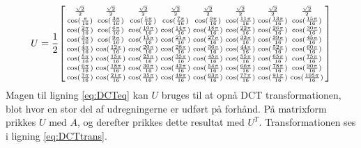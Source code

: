 \begin{equation}
U=\frac{1}{2}
\begin{bsmallmatrix}
	\frac{\sqrt{2}}{2}	& \frac{\sqrt{2}}{2}		& \frac{\sqrt{2}}{2}		& \frac{\sqrt{2}}{2}		& \frac{\sqrt{2}}{2}		& \frac{\sqrt{2}}{2}		& \frac{\sqrt{2}}{2}		& \frac{\sqrt{2}}{2}		\\
	\cos(\frac{\pi}{16})		& \cos(\frac{3\pi}{16})	& \cos(\frac{5\pi}{16})	& \cos(\frac{7\pi}{16})	& \cos(\frac{9\pi}{16})	& \cos(\frac{11\pi}{16})	& \cos(\frac{13\pi}{16})	& \cos(\frac{15\pi}{16})		\\
	\cos(\frac{2\pi}{16})	& \cos(\frac{6\pi}{16})	& \cos(\frac{10\pi}{16})	& \cos(\frac{14\pi}{16})	& \cos(\frac{18\pi}{16})	& \cos(\frac{22\pi}{16})	& \cos(\frac{26\pi}{16})	& \cos(\frac{30\pi}{16})		\\
	\cos(\frac{3\pi}{16})	& \cos(\frac{9\pi}{16})	& \cos(\frac{15\pi}{16})	& \cos(\frac{21\pi}{16})	& \cos(\frac{27\pi}{16})	& \cos(\frac{33\pi}{16})	& \cos(\frac{39\pi}{16})	& \cos(\frac{45\pi}{16})		\\
	\cos(\frac{4\pi}{16})	& \cos(\frac{12\pi}{16})	& \cos(\frac{20\pi}{16})	& \cos(\frac{28\pi}{16})	& \cos(\frac{36\pi}{16})	& \cos(\frac{44\pi}{16})	& \cos(\frac{52\pi}{16})	& \cos(\frac{60\pi}{16})		\\
	\cos(\frac{5\pi}{16})	& \cos(\frac{15\pi}{16})	& \cos(\frac{25\pi}{16})	& \cos(\frac{35\pi}{16})	& \cos(\frac{45\pi}{16})	& \cos(\frac{55\pi}{16})	& \cos(\frac{65\pi}{16})	& \cos(\frac{75\pi}{16})		\\
	\cos(\frac{6\pi}{16})	& \cos(\frac{18\pi}{16})	& \cos(\frac{30\pi}{16})	& \cos(\frac{42\pi}{16})	& \cos(\frac{54\pi}{16})	& \cos(\frac{66\pi}{16})	& \cos(\frac{78\pi}{16})	& \cos(\frac{90\pi}{16})		\\
	\cos(\frac{7\pi}{16})	& \cos(\frac{21\pi}{16})	& \cos(\frac{35\pi}{16})	& \cos(\frac{49\pi}{16})	& \cos(\frac{63\pi}{16})	& \cos(\frac{77\pi}{16})	& \cos(\frac{91\pi}{16})	& \cos(\frac{105\pi}{16})	\\
\end{bsmallmatrix}
\label{eq:DCTmatrix}
\end{equation}
Magen til ligning \vref{eq:DCTeq} kan $U$ bruges til at opnå DCT transformationen, blot hvor en stor del af udregningerne er udført på forhånd. På matrixform prikkes $U$ med $A$, og derefter prikkes dette resultat med $U^T$. Transformationen ses i ligning \vref{eq:DCTtrans}. %
